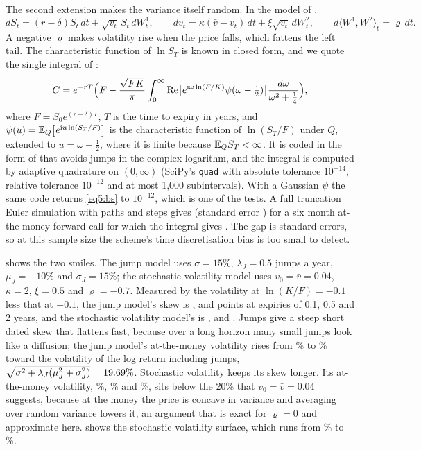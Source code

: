 \begin{chapterrefs}
The second extension makes the variance itself random. In the model of \textcite{heston1993},
\begin{equation*}
  dS_t=(r-\delta)S_t\,dt+\sqrt{v_t}\,S_t\,dW^1_t,\qquad dv_t=\kappa(\bar v-v_t)\,dt+\xi\sqrt{v_t}\,dW^2_t,\qquad
  d\langle W^1,W^2\rangle_t=\varrho\,dt .
\end{equation*}
A negative $\varrho$ makes volatility rise when the price falls, which fattens the left tail. The
characteristic function of $\ln S_T$ is known in closed form, and we quote the single integral of
\textcite{lewis2000}:
\begin{equation*}
  C=e^{-rT}\Bigl(F-\frac{\sqrt{FK}}\pi\int_0^\infty\operatorname{Re}\bigl[e^{\mathrm i\omega\ln(F/K)}\psi(\omega-\tfrac{\mathrm i}2)\bigr]\frac{d\omega}{\omega^2+\frac14}\Bigr),
\end{equation*}
where $F=S_0e^{(r-\delta)T}$, $T$ is the time to expiry in years, and
$\psi(u)=\mathbb{E}_Q\bigl[e^{\mathrm iu\ln(S_T/F)}\bigr]$ is the characteristic function of $\ln(S_T/F)$ under $Q$,
extended to $u=\omega-\tfrac{\mathrm i}2$, where it is finite because $\mathbb{E}_QS_T<\infty$. It is coded in the
form of \textcite{albrecher2007} that avoids jumps in the complex logarithm, and the integral is
computed by adaptive quadrature on $(0,\infty)$ (SciPy's \texttt{quad} with absolute tolerance $10^{-14}$,
relative tolerance $10^{-12}$ and at most 1,000 subintervals). With a Gaussian $\psi$ the same code returns
\cref{eq5:bs} to $10^{-12}$, which is one of the tests. A full truncation Euler simulation
\parencite{lord2010} with \hesMCPaths{} paths and \hesMCSteps{} steps gives \hesMC{} (standard error
\hesMCSE) for a six month at-the-money-forward call for which the integral gives \hesFourier. The gap is
\hesMCZ{} standard errors, so at this sample size the scheme's time discretisation bias is too small
to detect.

 shows the two smiles. The jump model uses $\sigma=15\%$, $\lambda_J=0.5$ jumps a year,
$\mu_J=-10\%$ and $\sigma_J=15\%$; the stochastic volatility model uses $v_0=\bar v=0.04$, $\kappa=2$,
$\xi=0.5$ and $\varrho=-0.7$. Measured by the volatility at $\ln(K/F)=-0.1$ less that at $+0.1$, the jump
model's skew is \skewMerShort, \skewMerMid{} and \skewMerLong{} points at expiries of 0.1, 0.5 and 2
years, and the stochastic volatility model's is \skewHesShort, \skewHesMid{} and \skewHesLong. Jumps give a
steep short dated skew that flattens fast, because over a long horizon many small jumps look like a
diffusion; the jump model's at-the-money volatility rises from \atmMerShort\% to \atmMerLong\% toward
the volatility of the log return including jumps, $\sqrt{\sigma^2+\lambda_J(\mu_J^2+\sigma_J^2)}=19.69\%$. Stochastic volatility
keeps its skew longer. Its at-the-money volatility, \atmHesShort\%, \atmHesMid\% and \atmHesLong\%, sits
below the 20\% that $v_0=\bar v=0.04$ suggests, because at the money the price is concave in variance
and averaging over random variance lowers it, an argument that is exact for $\varrho=0$
\parencite{hullwhite1987} and approximate here.  shows the stochastic volatility surface,
which runs from \hesSurfMin\% to \hesSurfMax\%.


\end{chapterrefs}
